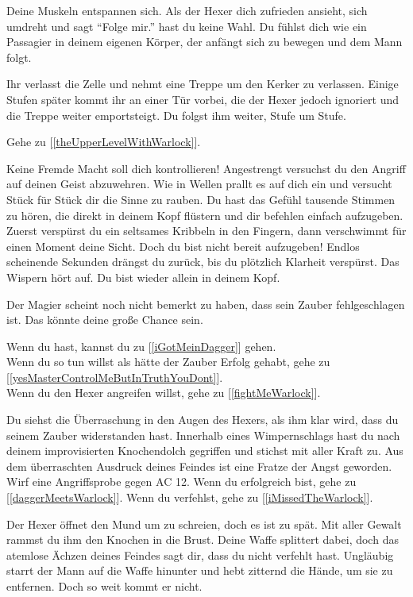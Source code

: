 Deine Muskeln entspannen sich. Als der Hexer dich zufrieden ansieht, sich umdreht und sagt ``Folge mir.'' hast du keine Wahl. Du fühlst dich wie ein Passagier in deinem eigenen Körper, der anfängt sich zu bewegen und dem Mann folgt.

Ihr verlasst die Zelle und nehmt eine Treppe um den Kerker zu verlassen. Einige Stufen später kommt ihr an einer Tür vorbei, die der Hexer jedoch ignoriert und die Treppe weiter emportsteigt. Du folgst ihm weiter, Stufe um Stufe.

Gehe zu [\ref{theUpperLevelWithWarlock}].


Keine Fremde Macht soll dich kontrollieren! Angestrengt versuchst du den Angriff auf deinen Geist abzuwehren. Wie in Wellen prallt es auf dich ein und versucht Stück für Stück dir die Sinne zu rauben. Du hast das Gefühl tausende Stimmen zu hören, die direkt in deinem Kopf flüstern und dir befehlen einfach aufzugeben. Zuerst verspürst du ein seltsames Kribbeln in den Fingern, dann verschwimmt für einen Moment deine Sicht. Doch du bist nicht bereit aufzugeben! Endlos scheinende Sekunden drängst du zurück, bis du plötzlich Klarheit verspürst. Das Wispern hört auf. Du bist wieder allein in deinem Kopf.

Der Magier scheint noch nicht bemerkt zu haben, dass sein Zauber fehlgeschlagen ist. Das könnte deine große Chance sein.

Wenn du  hast, kannst du zu [\ref{iGotMeinDagger}] gehen.
\\Wenn du so tun willst als hätte der Zauber Erfolg gehabt, gehe zu [\ref{yesMasterControlMeButInTruthYouDont}].
\\Wenn du den Hexer angreifen willst, gehe zu [\ref{fightMeWarlock}].


Du siehst die Überraschung in den Augen des Hexers, als ihm klar wird, dass du seinem Zauber widerstanden hast. Innerhalb eines Wimpernschlags hast du nach deinem improvisierten Knochendolch gegriffen und stichst mit aller Kraft zu. Aus dem überraschten Ausdruck deines Feindes ist eine Fratze der Angst geworden.
Wirf eine Angriffsprobe gegen AC 12. Wenn du erfolgreich bist, gehe zu [\ref{daggerMeetsWarlock}]. Wenn du verfehlst, gehe zu [\ref{iMissedTheWarlock}].


Der Hexer öffnet den Mund um zu schreien, doch es ist zu spät. Mit aller Gewalt rammst du ihm den Knochen in die Brust. Deine Waffe splittert dabei, doch das atemlose Ächzen deines Feindes sagt dir, dass du nicht verfehlt hast. Ungläubig starrt der Mann auf die Waffe hinunter und hebt zitternd die Hände, um sie zu entfernen. Doch so weit kommt er nicht.

